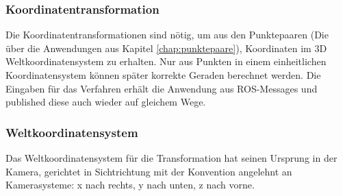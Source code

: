 \subsubsection{Koordinatentransformation}
Die Koordinatentransformationen sind nötig, um aus den Punktepaaren (Die über die Anwendungen aus Kapitel \ref{chap:punktepaare}), Koordinaten im 3D Weltkoordinatensystem zu erhalten. Nur aus Punkten in einem einheitlichen Koordinatensystem können später korrekte Geraden berechnet werden.
Die Eingaben für das Verfahren erhält die Anwendung aus ROS-Messages und published diese auch wieder auf gleichem Wege.

\subsubsection*{Weltkoordinatensystem}
\label{sec:koord}
Das Weltkoordinatensystem für die Transformation hat seinen Ursprung in der Kamera, gerichtet in Sichtrichtung mit der Konvention angelehnt an Kamerasysteme: x nach rechts, y nach unten, z nach vorne.

